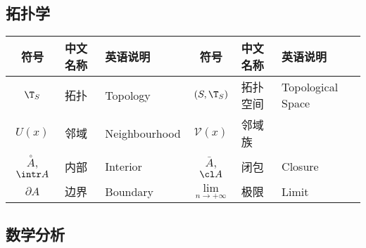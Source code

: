\documentclass[UTF8]{ctexart}
\begin{document}
        \subsection{拓扑学}
        
            \begin{center}
                \begin{tabular}{|c|l|l||c|l|l|}
                    \hline
                    符号 & 中文名称 & 英语说明 & 符号 & 中文名称 & 英语说明\\
                    \hline\hline
                    $\T_S$ & 拓扑 & Topology & $(S,\T_S)$ & 拓扑空间 & Topological Space\\
                    \hline
                    $U(x)$ & 邻域 & Neighbourhood & $\mathcal{V}(x)$ & 邻域族 &\\
                    \hline
                    $\overset{\circ}{A}$, $\intr A$ & 内部 & Interior & $\bar{A}$, $\cl A$ & 闭包 & Closure\\
                    \hline
                    $\partial A$ & 边界 & Boundary & $\lim\limits_{n\to+\infty}$ & 极限 & Limit\\
                    \hline
                \end{tabular}
            \end{center}

        \subsection{数学分析}
        
\end{document}
